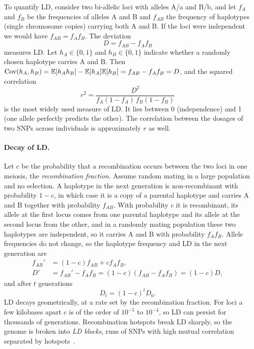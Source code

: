 To quantify LD, consider two bi-allelic loci with alleles A/a and B/b, and let $f_A$ and $f_B$ be the frequencies of alleles A and B and $f_{AB}$ the frequency of haplotypes (single chromosome copies) carrying both A and B. If the loci were independent we would have $f_{AB}=f_Af_B$. The deviation
\begin{equation}
  D = f_{AB}-f_Af_B
\end{equation}
measures LD. Let $h_A\in\{0,1\}$ and $h_B\in\{0,1\}$ indicate whether a randomly chosen haplotype carries A and B. Then $\operatorname{Cov}(h_A,h_B)=\mathbb{E}[h_Ah_B]-\mathbb{E}[h_A]\mathbb{E}[h_B]=f_{AB}-f_Af_B=D$, and the squared correlation
\begin{equation}
  r^2 = \frac{D^2}{f_A(1-f_A)\,f_B(1-f_B)}
  \label{eq:r2}
\end{equation}
is the most widely used measure of LD. It lies between 0 (independence) and 1 (one allele perfectly predicts the other). The correlation between the dosages of two SNPs across individuals is approximately $r$ as well.

\paragraph{Decay of LD.} Let $c$ be the probability that a recombination occurs between the two loci in one meiosis, the \emph{recombination fraction}. Assume random mating in a large population and no selection. A haplotype in the next generation is non-recombinant with probability $1-c$, in which case it is a copy of a parental haplotype and carries A and B together with probability $f_{AB}$. With probability $c$ it is recombinant, its allele at the first locus comes from one parental haplotype and its allele at the second locus from the other, and in a randomly mating population these two haplotypes are independent, so it carries A and B with probability $f_Af_B$. Allele frequencies do not change, so the haplotype frequency and LD in the next generation are
\begin{align}
  f_{AB}' &= (1-c)f_{AB}+cf_Af_B,\\
  D' &= f_{AB}'-f_Af_B = (1-c)(f_{AB}-f_Af_B) = (1-c)D,
\end{align}
and after $t$ generations
\begin{equation}
  D_t = (1-c)^tD_0 .
\end{equation}
LD decays geometrically, at a rate set by the recombination fraction. For loci a few kilobases apart $c$ is of the order of $10^{-5}$ to $10^{-4}$, so LD can persist for thousands of generations. Recombination hotspots break LD sharply, so the genome is broken into \emph{LD blocks}, runs of SNPs with high mutual correlation separated by hotspots~\citep{gabriel2002}.

